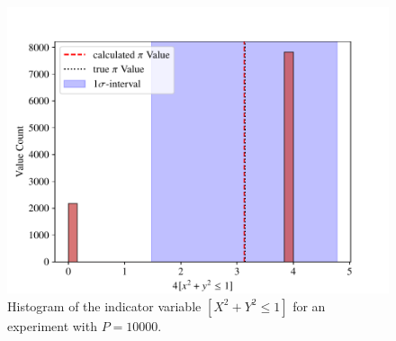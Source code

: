%
\begin{figure}[htbp]
    \centering
    \includegraphics[width=.6\linewidth]{figs/ex1.1_indicator_hist.pdf}
    \caption{Histogram of the indicator variable $[X^2 + Y^2 \leq 1]$ for an experiment 
        with $P = \num{10000}$.}
    \label{fig:indicator}
\end{figure}